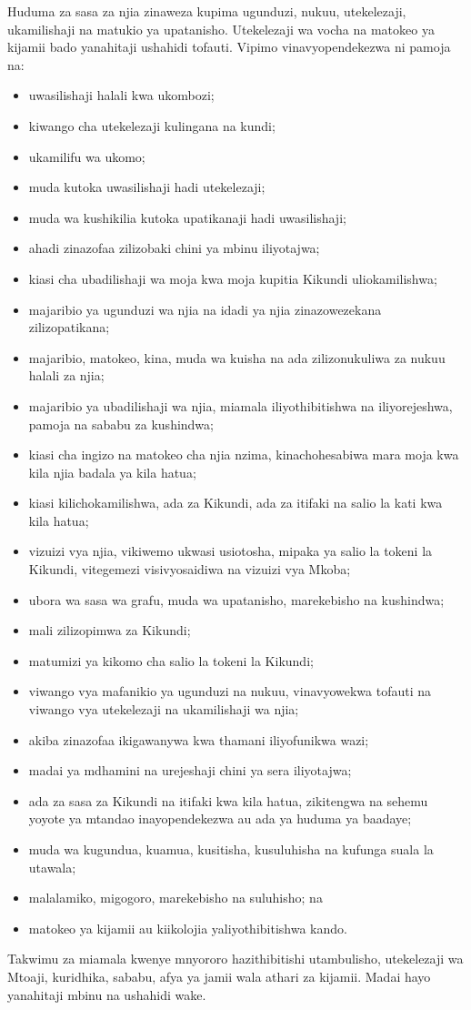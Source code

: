 \documentclass[11pt]{article}
\begin{document}
Huduma za sasa za njia zinaweza kupima ugunduzi, nukuu, utekelezaji, ukamilishaji na matukio ya upatanisho. Utekelezaji wa vocha na matokeo ya kijamii bado yanahitaji ushahidi tofauti. Vipimo vinavyopendekezwa ni pamoja na:

\begin{itemize}[leftmargin=*]
\item uwasilishaji halali kwa ukombozi;
\item kiwango cha utekelezaji kulingana na kundi;
\item ukamilifu wa ukomo;
\item muda kutoka uwasilishaji hadi utekelezaji;
\item muda wa kushikilia kutoka upatikanaji hadi uwasilishaji;
\item ahadi zinazofaa zilizobaki chini ya mbinu iliyotajwa;
\item kiasi cha ubadilishaji wa moja kwa moja kupitia Kikundi uliokamilishwa;
\item majaribio ya ugunduzi wa njia na idadi ya njia zinazowezekana zilizopatikana;
\item majaribio, matokeo, kina, muda wa kuisha na ada zilizonukuliwa za nukuu halali za njia;
\item majaribio ya ubadilishaji wa njia, miamala iliyothibitishwa na iliyorejeshwa, pamoja na sababu za kushindwa;
\item kiasi cha ingizo na matokeo cha njia nzima, kinachohesabiwa mara moja kwa kila njia badala ya kila hatua;
\item kiasi kilichokamilishwa, ada za Kikundi, ada za itifaki na salio la kati kwa kila hatua;
\item vizuizi vya njia, vikiwemo ukwasi usiotosha, mipaka ya salio la tokeni la Kikundi, vitegemezi visivyosaidiwa na vizuizi vya Mkoba;
\item ubora wa sasa wa grafu, muda wa upatanisho, marekebisho na kushindwa;
\item mali zilizopimwa za Kikundi;
\item matumizi ya kikomo cha salio la tokeni la Kikundi;
\item viwango vya mafanikio ya ugunduzi na nukuu, vinavyowekwa tofauti na viwango vya utekelezaji na ukamilishaji wa njia;
\item akiba zinazofaa ikigawanywa kwa thamani iliyofunikwa wazi;
\item madai ya mdhamini na urejeshaji chini ya sera iliyotajwa;
\item ada za sasa za Kikundi na itifaki kwa kila hatua, zikitengwa na sehemu yoyote ya mtandao inayopendekezwa au ada ya huduma ya baadaye;
\item muda wa kugundua, kuamua, kusitisha, kusuluhisha na kufunga suala la utawala;
\item malalamiko, migogoro, marekebisho na suluhisho; na
\item matokeo ya kijamii au kiikolojia yaliyothibitishwa kando.
\end{itemize}
Takwimu za miamala kwenye mnyororo hazithibitishi utambulisho, utekelezaji wa Mtoaji, kuridhika, sababu, afya ya jamii wala athari za kijamii. Madai hayo yanahitaji mbinu na ushahidi wake.
\end{document}
